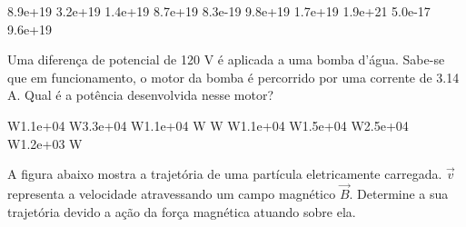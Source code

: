 \documentclass[12pt, addpoints]{exam}
\begin{document}
\begin{questions}
\begin{multicols*}{2}
\begin{oneparchoices}
\choice 8.9e+19 \choice 3.2e+19 \choice 1.4e+19 \choice 8.7e+19 \choice 8.3e-19 \choice 9.8e+19 \choice 1.7e+19 \choice 1.9e+21 \choice 5.0e-17 \choice 9.6e+19 
\end{oneparchoices}\question Uma diferença de potencial de 120 V é aplicada a uma bomba d’água. Sabe-se que em funcionamento, o motor da bomba é percorrido por uma corrente de    3.14 A. Qual é a potência desenvolvida nesse motor?

\begin{oneparchoices}
 W\choice 1.1e+04 W\choice 3.3e+04 W\choice 1.1e+04 W W W\choice 1.1e+04 W\choice 1.5e+04 W\choice 2.5e+04 W\choice 1.2e+03 W
\end{oneparchoices}\question A ﬁgura abaixo mostra a trajetória de uma partícula eletricamente carregada. $\vec{{v}}$ representa a velocidade atravessando um campo magnético $\vec{{B}}$. Determine a sua trajetória devido a ação da força magnética atuando sobre ela.
        
        \begin{center}
            \begin{minipage}[c]{0.5\linewidth}
            \end{minipage}
        \end{center}

        


\end{multicols*}
\end{questions}
\end{document}
